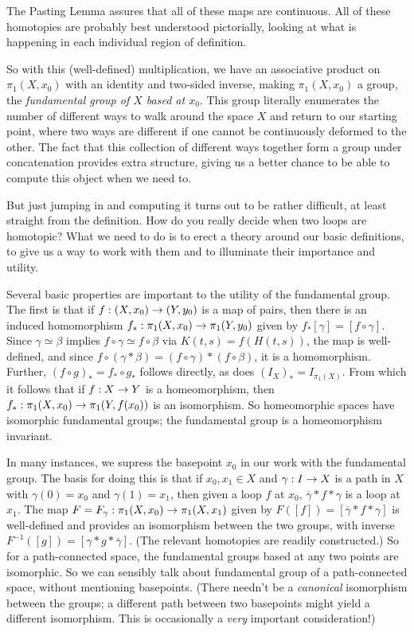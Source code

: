 The Pasting Lemma assures that all of these maps are continuous.
All of these homotopies are probably best understood pictorially, looking at what 
is happening in each individual region of definition.

\msk

So with this (well-defined) multiplication, we have an associative
product on $\pi_1(X,x_0)$ with an identity and two-sided inverse, making
$\pi_1(X,x_0)$ a group, the {\it fundamental group of $X$ based at $x_0$}.
This group literally enumerates the number of different ways to walk around the
space $X$ and return to our starting point, where two ways are different
if one cannot be continuously deformed to the other. The fact that
this collection of different ways together form a group under concatenation
provides extra structure, giving us a better chance to be able to compute
this object when we need to.

\ssk

But just jumping in and computing it turns out to be rather difficult, 
at least straight from the definition. How do you really decide when
two loops are homotopic? What we need to do is to erect a theory around
our basic definitions, to give us a way to work with them and to 
illuminate their importance and utility.

\ssk

Several basic properties are important to the utility of the fundamental
group. The first is that if $f:(X,x_0)\rightarrow (Y,y_0)$ is a map of pairs,
then there is an induced homomorphism $f_*:\pi_1(X,x_0)\rightarrow \pi_1(Y,y_0)$
given by $f_*[\gamma]=[f\circ\gamma]$. Since $\gamma\simeq\beta$ implies
$f\circ\gamma\simeq f\circ\beta$ via $K(t,s)=f(H(t,s))$, the map 
is well-defined, and since
$f\circ(\gamma*\beta)=(f\circ\gamma)*(f\circ\beta)$, it is a homomorphism.
Further, $(f\circ g)_*=f_*\circ g_*$ follows directly, as does $(I_X)_*=I_{\pi_1(X)}$.
From which it follows that if $f:X\rightarrow Y$ is a homeomorphism, then
$f_*:\pi_1(X,x_0)\rightarrow \pi_1(Y,f(x_0))$ is an isomorphism. So homeomorphic
spaces have isomorphic fundamental groups; the fundamental group is a
homeomorphism invariant.

\ssk

In many instances, we supress the basepoint $x_0$ in our work with the
fundamental group. The basis for doing this is that if 
$x_0,x_1\in X$ and $\gamma:I\rightarrow X$ is a path in $X$ with 
$\gamma(0)=x_0$ and $\gamma(1)=x_1$, then given a loop $f$ at $x_0$,
$\overline{\gamma}*f*\gamma$ is a loop at $x_1$. The map
$F=F_\gamma:\pi_1(X,x_0)\rightarrow \pi_1(X,x_1)$ given by $F([f])=[\overline{\gamma}*f*\gamma]$
is well-defined and provides an isomorphism between the two groups, 
with inverse $F^{-1}([g])=[\gamma*g*\overline{\gamma}]$.
(The relevant homotopies are readily constructed.) So for a
path-connected space, the fundamental groups based at any two points
are isomorphic. So we can sensibly talk about 
fundamental group of a path-connected space, without mentioning 
basepoints. (There needn't be a {\it canonical} isomorphism between
the groups; a different path between two basepoints might yield a 
different isomorphism. This is occasionally a {\it very} important
consideration!)

